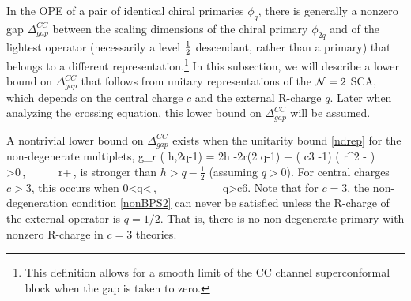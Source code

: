 \documentclass[12pt]{article}
\begin{document}
In the  OPE of a pair of identical chiral primaries $\phi_q$, there is generally a nonzero gap  $\Delta^{CC}_{gap}$ between the scaling dimensions of the chiral primary $\phi_{2q}$ and of the lightest operator (necessarily a level ${1\over 2}$ descendant, rather than a primary) that belongs to a different representation.\footnote{%
This definition allows for a smooth limit of the CC channel superconformal block when the gap is taken to zero.
} In this subsection, we will describe a lower bound on $\Delta^{CC}_{gap}$ that follows from unitary representations of the ${\mathcal N}=2$ SCA, which depends on the central charge $c$ and the external R-charge $q$.  Later when analyzing the crossing equation, this lower bound on $\Delta^{CC}_{gap}$ will be assumed.





A nontrivial lower bound on $\Delta^{CC}_{gap}$ exists when the unitarity bound \eqref{ndrep} for the non-degenerate multiplets,
\ie\label{nonBPS2}
g_r (  h,2q-1)  =  2h  -2r(2 q-1)  + \left( \frac c3 -1\right) \left( r^2 - \right) >0\,,~~~~~\forall\, r\in {}+\,,
\fe
is stronger than $h>q -\frac12$ (assuming $q>0$). 
For central charges $c>3$, this occurs when
\ie\label{nonzeroCCgap}
0<q<\,,~~~~~~~~~~~~q>\frac c6. 
\fe
Note that for $c=3$, the non-degeneration condition \eqref{nonBPS2} can never be satisfied unless the R-charge of the external operator is $q=1/2$. That is, there is no non-degenerate primary with nonzero R-charge in $c=3$ theories.
\end{document}
